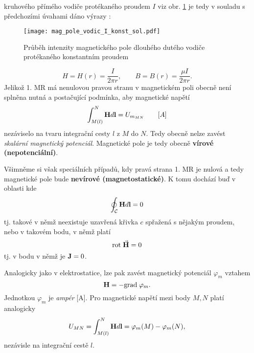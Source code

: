 {    kruhové\-ho přímého vodiče protékaného proudem $I$ viz obr. \ref{teo:fig018} je tedy v souladu 
    s předchozími úvahami dáno výrazy \cite[s.~183 - 185]{Kotlan1999}:
    \begin{figure}[ht!]
      \centering
      \texttt{[image: mag\_pole\_vodic\_I\_konst\_sol.pdf]}
      \caption[Průběh intenzity magnetického pole dlouhého dutého vodiče protékaného konstantním
               proudem]{Průběh intenzity magnetického pole dlouhého dutého vodiče protékaného
               konstantním proudem}
      \label{teo:fig018}
    \end{figure}      
      \begin{equation}\label{TEMP:eq_Hr_Br_vodice}
        H = H(r) = \frac{I}{2\pi r}, \qquad B = B(r) = \frac{\mu I}{2\pi r}.
      \end{equation}   
    Jelikož 1. MR má nenulovou pravou stranu v magnetickém poli obecně není splněna nutná a
    postačující podmínka, aby magnetické napětí
      \begin{equation}\label{TEMP:eq_mag_napeti}
        \int_{M(l)}^N\mathbf{H}d\mathbf{l} = U_{m_{MN}} \qquad [A]
      \end{equation}       
    nezáviselo na tvaru integrační cesty $l$ z $M$ do $N$. Tedy obecně nelze zavést \emph{skalární
    magnetický potenciál}. Magnetické pole je tedy obecně \textbf{vírové (nepotenciální)}.

    Všimněme si však speciálních případů, kdy pravá strana 1. MR je nulová a tedy magnetické pole
    bude \textbf{nevírové (magnetostatické)}. K tomu dochází buď v oblasti kde 
      \begin{equation}\label{TEMP:eq_1MR_0}
        \oint_{\mathcal{C}}\mathbf{H}d\mathbf{l} = 0
      \end{equation}    
    tj. takové v němž neexistuje uzavřená křivka $c$ spřažená s nějakým proudem, nebo v takovém
    bodu, v němž platí
      \begin{equation}\label{TEMP:eq_rotH_0}
        \mathrm{rot}\;\vec{\mathbf{H}} = 0
      \end{equation}
    tj. v bodu v němž je $\mathbf{J} = 0$.
    
    Analogicky jako v elektrostatice, lze pak zavést magnetický potenciál $\varphi_m$ vztahem  
      \begin{equation}\label{TEMP:eq_grad_varphi_m}
        \mathbf{H} = - \mathrm{grad\;}\varphi_m.
      \end{equation}              
    Jednotkou $\varphi_m$ je \emph{ampér} [A]. Pro magnetické napětí mezi body $M, N$ platí
    analogicky
      \begin{equation}\label{TEMP:eq_Umn_def}
        U_{MN} = \int_{M(l)}^N\mathbf{H}d\mathbf{l} = \varphi_m(M) - \varphi_m(N),
      \end{equation}        
    nezávisle na integrační cestě $l$. 
     
}
